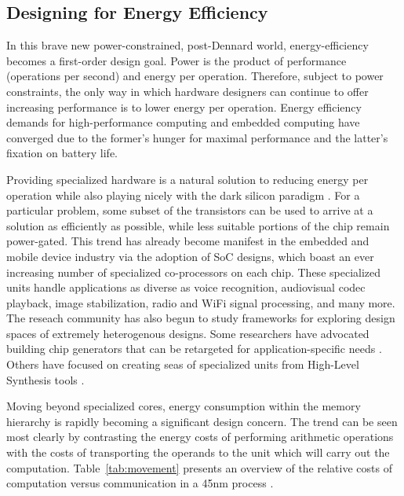 \subsection{Designing for Energy Efficiency}

In this brave new power-constrained, post-Dennard world, energy-efficiency becomes a first-order design goal.
Power is the product of performance (operations per second) and energy per operation.
Therefore, subject to power constraints, the only way in which hardware designers can continue to offer increasing performance is to lower energy per operation.
Energy efficiency demands for high-performance computing and embedded computing have converged due to the former's hunger for maximal performance and the latter's fixation on battery life.

Providing specialized hardware is a natural solution to reducing energy per operation while also playing nicely with the dark silicon paradigm \cite{esmaeilzadeh2011dark}.
For a particular problem, some subset of the transistors can be used to arrive at a solution as efficiently as possible, while less suitable portions of the chip remain power-gated.
This trend has already become manifest in the embedded and mobile device industry via the adoption of SoC designs, which boast an ever increasing number of specialized co-processors on each chip.
These specialized units handle applications as diverse as voice recognition, audiovisual codec playback, image stabilization, radio and WiFi signal processing, and many more.
The reseach community has also begun to study frameworks for exploring design spaces of extremely heterogenous designs.
Some researchers have advocated building chip generators that can be retargeted for application-specific needs \cite{shacham-micro10}.
Others have focused on creating seas of specialized units from High-Level Synthesis tools \cite{shao2014aladdin, Venkatesh:2010}.

Moving beyond specialized cores, energy consumption within the memory hierarchy is rapidly becoming a significant design concern.
The trend can be seen most clearly by contrasting the energy costs of performing arithmetic operations with the costs of transporting the operands to the unit which will carry out the computation.
Table~\ref{tab:movement} presents an overview of the relative costs of computation versus communication in a 45nm process \cite{dally-hpca02}.

